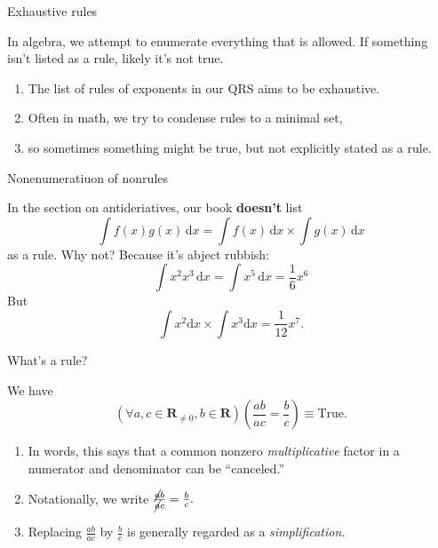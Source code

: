 \documentclass[portrait,fleqn,12pt]{beamer}
\newcommand{\reals}{\mathbf{R}}
\newenvironment{handlist}
   {\begin{enumerate}[\faHandPointRight]
       \addtolength{\itemsep}{0.0\itemsep}}
     {\end{enumerate}}
\begin{document}
\begin{frame}{Exhaustive rules}

In algebra, we attempt to enumerate everything that is allowed. If something isn't listed as a rule, likely it's not true.

\begin{handlist}
\item The list of rules of exponents in our QRS aims to be exhaustive.

\item  Often in math, we try  to condense rules to a minimal set, 

\item so sometimes something might be true, but not explicitly stated as a rule.
\end{handlist}

\end{frame}

\begin{frame}{Nonenumeratiuon of nonrules}

In the section on antideriatives, our book \textbf{doesn't} list
\begin{equation*}
    \int f(x) g(x) \, \mathrm{d} x = \int f(x) \, \mathrm{d} x 
     \times \int g(x) \, \mathrm{d} x 
\end{equation*}
as a rule. Why not? Because it's abject rubbish:
\begin{equation*}
  \int x^2 x^3 \, \mathrm{d} x = \int x^5 \, \mathrm{d} x = \frac{1}{6} x^6
\end{equation*}
But
\begin{equation*}
  \int x^2 \mathrm{d} x \times \int x^3 \mathrm{d} x  = \frac{1}{12} x^7.
\end{equation*}

  
\end{frame}

\begin{frame}{What's a  rule?}

\begin{theorem} We have 
\begin{equation*} 
   \left(\forall a, c\in \reals_{\neq 0}, b \in \reals \right)\left(\frac{a b}{a c} = \frac{b}{c} \right) \equiv \text{True}.
  \end{equation*}
\end{theorem}

\begin{handlist}
\item In words, this says that a common nonzero \emph{multiplicative} factor in a numerator and denominator can be ``canceled.''
\item Notationally, we write 
$
\frac{\cancel{a} b}{ \cancel{a} c}  = \frac{b}{c}.
$
\item Replacing $\frac{a b}{a c}$ by $\frac{b}{c}$ is generally regarded as a \emph{simplification.}

\end{handlist}

\end{frame}
\end{document}
